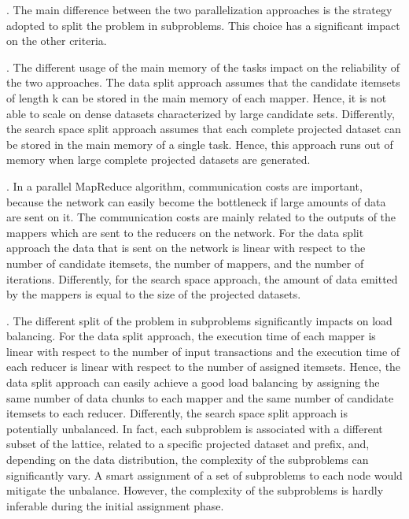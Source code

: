 . 
The main difference between the two parallelization approaches is the strategy adopted to split the problem in subproblems. This choice has a significant impact on the other criteria.

. 
The different usage of the main memory of the tasks impact on the reliability of the two approaches. The data split approach assumes that the candidate itemsets of length k can be stored in the main memory of each mapper. Hence, it is not able to scale on dense datasets
characterized by large candidate sets. Differently, the search space split approach assumes that each complete projected dataset can be stored in the main memory of a single task. Hence, this approach runs out of memory when large complete projected datasets are generated.  

. In a parallel MapReduce algorithm, communication costs are important, because the network can easily become the bottleneck if large amounts of data are sent on it.
The communication costs are mainly related to the outputs of the mappers which are sent to the reducers on the network. 
For the data split approach the data that is sent on the network is linear with respect 
to the number of candidate itemsets, the number of mappers, and the number of iterations.
Differently, for the search space approach, the amount of data emitted by the mappers is equal to the size of the projected datasets. 


. 
The different split of the problem in subproblems significantly impacts on load balancing. For the data split approach, the execution time of each mapper 
is linear with respect to the number of input transactions and the execution time of each reducer is linear with respect to the number of assigned itemsets.
Hence, the data split approach can easily achieve a good load balancing by assigning the same number of data chunks to each mapper and the same number of candidate itemsets to each reducer. 
Differently, the search space split approach is potentially unbalanced. In fact, each subproblem is associated with a different subset of the lattice, related to a specific projected dataset and prefix, and, depending on the data distribution, the complexity of the subproblems can significantly vary. 
A smart assignment of a set of subproblems to each node would mitigate the unbalance. However, the complexity of the subproblems is hardly inferable during the initial assignment phase.

